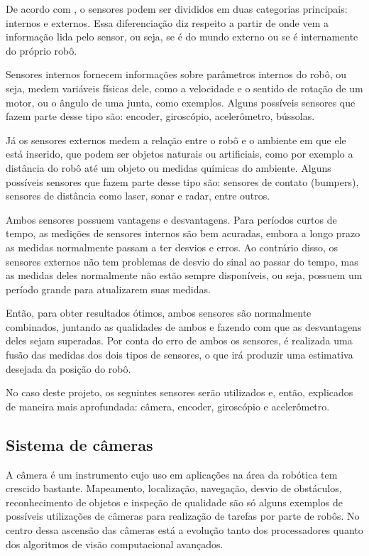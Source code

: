 \documentclass[acronym, symbols, table]{fei}
\begin{document}
			De acordo com \textcite{sensorFusionKalmanFilter}, o sensores podem ser divididos em duas categorias principais: internos e externos. Essa diferenciação diz respeito a partir de onde vem a informação lida pelo sensor, ou seja, se é do mundo externo ou se é internamente do próprio robô.
			
			Sensores internos fornecem informações sobre parâmetros internos do robô, ou seja, medem variáveis físicas dele, como a velocidade e o sentido de rotação de um motor, ou o ângulo de uma junta, como exemplos. Alguns possíveis sensores que fazem parte desse tipo são: encoder, giroscópio, acelerômetro, bússolas.
			
			Já os sensores externos medem a relação entre o robô e o ambiente em que ele está inserido, que podem ser objetos naturais ou artificiais, como por exemplo a distância do robô até um objeto ou medidas químicas do ambiente. Alguns possíveis sensores que fazem parte desse tipo são: sensores de contato (bumpers), sensores de distância como laser, sonar e radar, entre outros.
			
			Ambos sensores possuem vantagens e desvantagens. Para períodos curtos de tempo, as medições de sensores internos são bem acuradas, embora a longo prazo as medidas normalmente passam a ter desvios e erros. Ao contrário disso, os sensores externos não tem problemas de desvio do sinal ao passar do tempo, mas as medidas deles normalmente não estão sempre disponíveis, ou seja, possuem um período grande para atualizarem suas medidas.
			
			Então, para obter resultados ótimos, ambos sensores são normalmente combinados, juntando as qualidades de ambos e fazendo com que as desvantagens deles sejam superadas. Por conta do erro de ambos os sensores, é realizada uma fusão das medidas dos dois tipos de sensores, o que irá produzir uma estimativa desejada da posição do robô.
			
			No caso deste projeto, os seguintes sensores serão utilizados e, então, explicados de maneira mais aprofundada: câmera, encoder, giroscópio e acelerômetro.
			
			\subsection{Sistema de câmeras} \label{sec:sensores_cameras}
			
				A câmera é um instrumento cujo uso em aplicações na área da robótica tem crescido bastante. Mapeamento, localização, navegação, desvio de obstáculos, reconhecimento de objetos e inspeção de qualidade são só alguns exemplos de possíveis utilizações de câmeras para realização de tarefas por parte de robôs. No centro dessa ascensão das câmeras está a evolução tanto dos processadores quanto dos algoritmos de visão computacional avançados.
				
\end{document}
